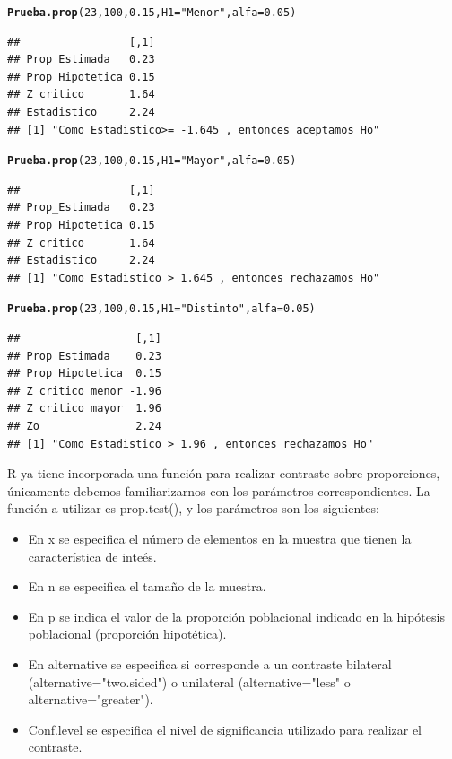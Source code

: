 \documentclass[12pt,letterpaper]{article}\usepackage[]{graphicx}\usepackage[]{color}
\makeatletter
\newcommand{\hlnum}[1]{\textcolor[rgb]{0.686,0.059,0.569}{#1}}%
\newcommand{\hlstr}[1]{\textcolor[rgb]{0.192,0.494,0.8}{#1}}%
\newcommand{\hlstd}[1]{\textcolor[rgb]{0.345,0.345,0.345}{#1}}%
\newcommand{\hlkwc}[1]{\textcolor[rgb]{0.333,0.667,0.333}{#1}}%
\newcommand{\hlkwd}[1]{\textcolor[rgb]{0.737,0.353,0.396}{\textbf{#1}}}%
\newenvironment{kframe}{%
 \def\at@end@of@kframe{}%
 \ifinner\ifhmode%
  \def\at@end@of@kframe{\end{minipage}}%
  \begin{minipage}{\columnwidth}%
 \fi\fi%
 \def\FrameCommand##1{\hskip\@totalleftmargin \hskip-\fboxsep
 \colorbox{shadecolor}{##1}\hskip-\fboxsep
     \hskip-\linewidth \hskip-\@totalleftmargin \hskip\columnwidth}%
 \MakeFramed {\advance\hsize-\width
   \@totalleftmargin\z@ \linewidth\hsize
   \@setminipage}}%
 {\par\unskip\endMakeFramed%
 \at@end@of@kframe}
\newenvironment{knitrout}{}{} %
\makeatother
\begin{document}
\begin{knitrout}
\begin{kframe}
\begin{alltt}
\hlkwd{Prueba.prop}\hlstd{(}\hlnum{23}\hlstd{,} \hlnum{100}\hlstd{,} \hlnum{0.15}\hlstd{,} \hlkwc{H1}\hlstd{=}\hlstr{"Menor"}\hlstd{,} \hlkwc{alfa}\hlstd{=}\hlnum{0.05}\hlstd{)}
\end{alltt}
\begin{verbatim}
##                 [,1]
## Prop_Estimada   0.23
## Prop_Hipotetica 0.15
## Z_critico       1.64
## Estadistico     2.24
## [1] "Como Estadistico>= -1.645 , entonces aceptamos Ho"
\end{verbatim}
\begin{alltt}
\hlkwd{Prueba.prop}\hlstd{(}\hlnum{23}\hlstd{,} \hlnum{100}\hlstd{,} \hlnum{0.15}\hlstd{,} \hlkwc{H1}\hlstd{=}\hlstr{"Mayor"}\hlstd{,} \hlkwc{alfa}\hlstd{=}\hlnum{0.05}\hlstd{)}
\end{alltt}
\begin{verbatim}
##                 [,1]
## Prop_Estimada   0.23
## Prop_Hipotetica 0.15
## Z_critico       1.64
## Estadistico     2.24
## [1] "Como Estadistico > 1.645 , entonces rechazamos Ho"
\end{verbatim}
\begin{alltt}
\hlkwd{Prueba.prop}\hlstd{(}\hlnum{23}\hlstd{,} \hlnum{100}\hlstd{,} \hlnum{0.15}\hlstd{,} \hlkwc{H1}\hlstd{=}\hlstr{"Distinto"}\hlstd{,} \hlkwc{alfa}\hlstd{=}\hlnum{0.05}\hlstd{)}
\end{alltt}
\begin{verbatim}
##                  [,1]
## Prop_Estimada    0.23
## Prop_Hipotetica  0.15
## Z_critico_menor -1.96
## Z_critico_mayor  1.96
## Zo               2.24
## [1] "Como Estadistico > 1.96 , entonces rechazamos Ho"
\end{verbatim}
\end{kframe}
\end{knitrout}

R ya tiene incorporada una funci\'on para realizar contraste sobre proporciones, \'unicamente debemos familiarizarnos con los par\'ametros correspondientes. La funci\'on a utilizar es prop.test(), y los par\'ametros son los siguientes:

\begin{itemize}
  \item En x se especifica el n\'umero de elementos en la muestra que tienen la caracter\'istica de inte\'es.
  \item En n se especifica el tama\~no de la muestra. 
  \item En p se indica el valor de la proporci\'on poblacional indicado en la hip\'otesis poblacional (proporci\'on hipot\'etica).
  \item En alternative se especifica si corresponde a un contraste bilateral (alternative="two.sided") o unilateral (alternative="less"  o alternative="greater"). 
  \item Conf.level se especifica el nivel de significancia utilizado para realizar el contraste.
\end{itemize}
\end{document}
